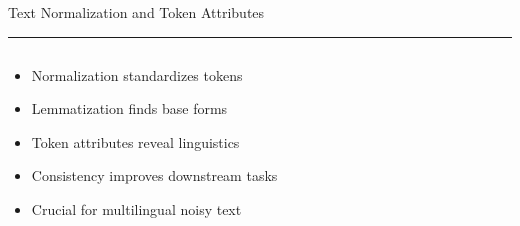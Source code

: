 \documentclass[aspectratio=169]{beamer}
\newcommand{\TitleFont}{\rmfamily}
\begin{document}
\begin{frame}[t]{}
  \vspace*{0.5cm}
  {\TitleFont\fontsize{18}{22}\selectfont\color{LUBronze}Text Normalization and Token Attributes\par}
  \vspace{0.3em}
  {\color{LUBronze}\rule{\linewidth}{0.8pt}}\par
  \vspace{0.2cm}
  \begin{columns}[t]
    \begin{column}[t]{0.45\textwidth}
      \vspace*{0pt}
      \begin{itemize}\setlength\itemsep{0.65em}
        \item Normalization standardizes tokens
        \item Lemmatization finds base forms
        \item Token attributes reveal linguistics
        \item Consistency improves downstream tasks
        \item Crucial for multilingual noisy text
      \end{itemize}
    \end{column}
  \end{columns}
\end{frame}
\end{document}

